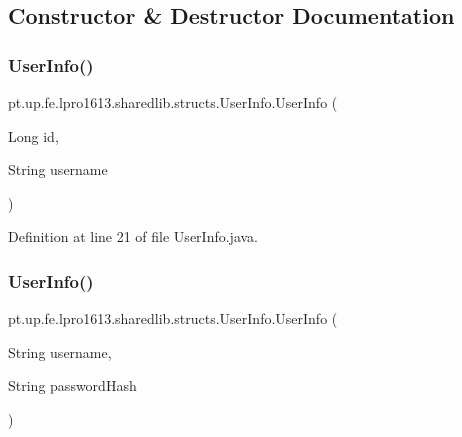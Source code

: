 \subsection{Constructor \& Destructor Documentation}
\hypertarget{classpt_1_1up_1_1fe_1_1lpro1613_1_1sharedlib_1_1structs_1_1_user_info_a2562f4a90f817fc7aa3d42ee0bf2b51b}{}\label{classpt_1_1up_1_1fe_1_1lpro1613_1_1sharedlib_1_1structs_1_1_user_info_a2562f4a90f817fc7aa3d42ee0bf2b51b} 
\subsubsection{\texorpdfstring{User\+Info()}{UserInfo()}\hspace{0.1cm}{\footnotesize\ttfamily [1/3]}}
{\footnotesize\ttfamily pt.\+up.\+fe.\+lpro1613.\+sharedlib.\+structs.\+User\+Info.\+User\+Info (\begin{DoxyParamCaption}\item[{Long}]{id,  }\item[{String}]{username }\end{DoxyParamCaption})}



Definition at line 21 of file User\+Info.\+java.

\hypertarget{classpt_1_1up_1_1fe_1_1lpro1613_1_1sharedlib_1_1structs_1_1_user_info_a8e5ef9f32e1ca435241435be898d85d6}{}\label{classpt_1_1up_1_1fe_1_1lpro1613_1_1sharedlib_1_1structs_1_1_user_info_a8e5ef9f32e1ca435241435be898d85d6} 
\subsubsection{\texorpdfstring{User\+Info()}{UserInfo()}\hspace{0.1cm}{\footnotesize\ttfamily [2/3]}}
{\footnotesize\ttfamily pt.\+up.\+fe.\+lpro1613.\+sharedlib.\+structs.\+User\+Info.\+User\+Info (\begin{DoxyParamCaption}\item[{String}]{username,  }\item[{String}]{password\+Hash }\end{DoxyParamCaption})}




